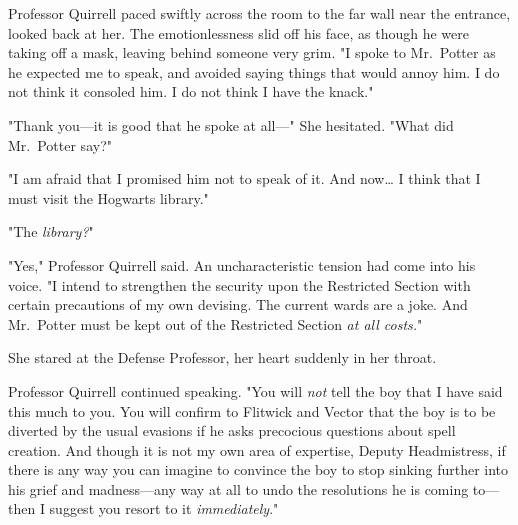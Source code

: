 Professor Quirrell paced swiftly across the room to the far wall near the entrance, looked back at her. The emotionlessness slid off his face, as though he were taking off a mask, leaving behind someone very grim. "I spoke to Mr.~Potter as he expected me to speak, and avoided saying things that would annoy him. I do not think it consoled him. I do not think I have the knack."

"Thank you---it is good that he spoke at all---" She hesitated. "What did Mr.~Potter say?"

"I am afraid that I promised him not to speak of it. And now{\ldots} I think that I must visit the Hogwarts library."

"The \emph{library?}"

"Yes," Professor Quirrell said. An uncharacteristic tension had come into his voice. "I intend to strengthen the security upon the Restricted Section with certain precautions of my own devising. The current wards are a joke. And Mr.~Potter must be kept out of the Restricted Section \emph{at all costs.}"

She stared at the Defense Professor, her heart suddenly in her throat.

Professor Quirrell continued speaking. "You will \emph{not} tell the boy that I have said this much to you. You will confirm to Flitwick and Vector that the boy is to be diverted by the usual evasions if he asks precocious questions about spell creation. And though it is not my own area of expertise, Deputy Headmistress, if there is any way you can imagine to convince the boy to stop sinking further into his grief and madness---any way at all to undo the resolutions he is coming to---then I suggest you resort to it \emph{immediately}."